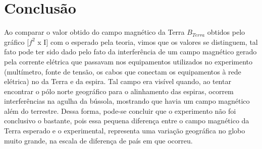 \section{Conclusão}
    Ao comparar o valor obtido do campo magnético da Terra $B_{Terra}$ 
    obtidos pelo gráfico [$f^2$ x I] com o esperado pela teoria, 
    vimos que os valores se distinguem, tal fato pode ter sido 
    dado pelo fato da interferência de um campo magnético gerado pela 
    corrente elétrica que passavam nos equipamentos utilizados no 
    experimento (multímetro, fonte de tensão, os cabos que conectam 
    os equipamentos à rede elétrica)  no da Terra e da espira. 
    Tal campo era visível quando, ao tentar encontrar o pólo norte 
    geográfico para o alinhamento das espiras, ocorrem interferências 
    na agulha da bússola, mostrando que havia um campo magnético além 
    do terrestre. Dessa forma, pode-se concluir que o experimento não 
    foi conclusivo o bastante, pois essa pequena diferença entre o 
    campo magnético da Terra esperado e o experimental, representa uma 
    variação geográfica no globo muito grande, na escala de diferença de 
    país em que ocorreu.